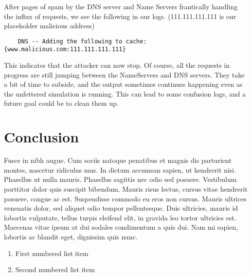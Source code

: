 \documentclass[a4paper, 12pt]{article} %
\begin{document}
After pages of spam by the DNS server and Name Servers frantically handling the influx of requests, we see the following in our logs. (111.111.111.111 is our placeholder malicious address)

\begin{verbatim}
    DNS -- Adding the following to cache: {www.malicious.com:111.111.111.111}
\end{verbatim}

This indicates that the attacker can now stop. Of course, all the requests in progress are still jumping between the NameServers and DNS servers. They take a bit of time to subside, and the output sometimes continues happening even as the unfettered simulation is running. This can lead to some confusion logs, and a future goal could be to clean them up.


\section*{Conclusion}

Fusce in nibh augue. Cum sociis natoque penatibus et magnis dis parturient montes, nascetur ridiculus mus. In dictum accumsan sapien, ut hendrerit nisi. Phasellus ut nulla mauris. Phasellus sagittis nec odio sed posuere. Vestibulum porttitor dolor quis suscipit bibendum. Mauris risus lectus, cursus vitae hendrerit posuere, congue ac est. Suspendisse commodo eu eros non cursus. Mauris ultrices venenatis dolor, sed aliquet odio tempor pellentesque. Duis ultricies, mauris id lobortis vulputate, tellus turpis eleifend elit, in gravida leo tortor ultricies est. Maecenas vitae ipsum at dui sodales condimentum a quis dui. Nam mi sapien, lobortis ac blandit eget, dignissim quis nunc.

\begin{enumerate}
\item First numbered list item
\item Second numbered list item
\end{enumerate}
\end{document}
